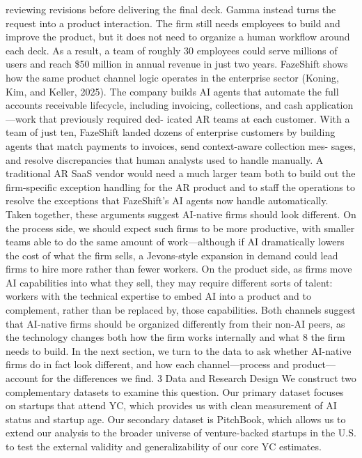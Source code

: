 reviewing revisions before delivering the final deck. Gamma instead turns the request into a product
interaction. The firm still needs employees to build and improve the product, but it does not need
to organize a human workflow around each deck. As a result, a team of roughly 30 employees could
serve millions of users and reach \$50 million in annual revenue in just two years.
FazeShift shows how the same product channel logic operates in the enterprise sector (Koning,
Kim, and Keller, 2025). The company builds AI agents that automate the full accounts receivable
lifecycle, including invoicing, collections, and cash application—work that previously required ded-
icated AR teams at each customer. With a team of just ten, FazeShift landed dozens of enterprise
customers by building agents that match payments to invoices, send context-aware collection mes-
sages, and resolve discrepancies that human analysts used to handle manually. A traditional AR
SaaS vendor would need a much larger team both to build out the firm-specific exception handling
for the AR product and to staff the operations to resolve the exceptions that FazeShift’s AI agents
now handle automatically.
Taken together, these arguments suggest AI-native firms should look different. On the process
side, we should expect such firms to be more productive, with smaller teams able to do the same
amount of work—although if AI dramatically lowers the cost of what the firm sells, a Jevons-style
expansion in demand could lead firms to hire more rather than fewer workers. On the product side,
as firms move AI capabilities into what they sell, they may require different sorts of talent: workers
with the technical expertise to embed AI into a product and to complement, rather than be replaced
by, those capabilities. Both channels suggest that AI-native firms should be organized differently
from their non-AI peers, as the technology changes both how the firm works internally and what
8
the firm needs to build. In the next section, we turn to the data to ask whether AI-native firms do
in fact look different, and how each channel—process and product—account for the differences we
find.
3
Data and Research Design
We construct two complementary datasets to examine this question. Our primary dataset focuses
on startups that attend YC, which provides us with clean measurement of AI status and startup
age. Our secondary dataset is PitchBook, which allows us to extend our analysis to the broader
universe of venture-backed startups in the U.S. to test the external validity and generalizability of
our core YC estimates.
